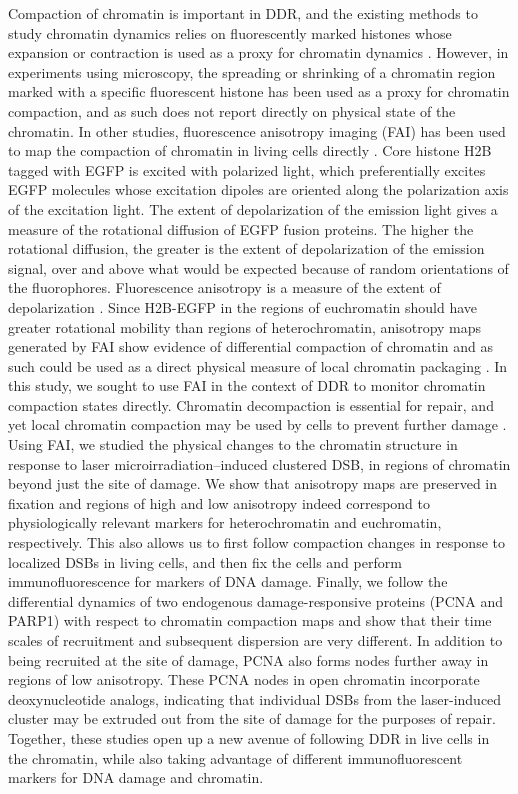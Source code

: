 Compaction of chromatin is important in DDR, and the existing methods to study chromatin dynamics relies on fluorescently marked histones whose expansion or contraction is used as a proxy for chromatin dynamics \cite{BURGESS20141703}.  However, in experiments using microscopy, the spreading or shrinking of a chromatin region marked with a specific fluorescent histone has been used as a proxy for chromatin compaction, and as such does not report directly on physical state of the chromatin. In other studies, fluorescence anisotropy imaging (FAI) has been used to map the compaction of chromatin in living cells directly \cite{banerjee2006chromatin}. Core histone H2B tagged with EGFP is excited with polarized light, which preferentially excites EGFP molecules whose excitation dipoles are oriented along the polarization axis of the excitation light. The extent of depolarization of the emission light gives a measure of the rotational diffusion of EGFP fusion proteins. The higher the rotational diffusion, the greater is the extent of depolarization of the emission signal, over and above what would be expected because of random orientations of the fluorophores. Fluorescence anisotropy is a measure of the extent of depolarization \cite{lakowicz2013principles,ghosh2012dynamic}. Since H2B-EGFP in the regions of euchromatin should have greater rotational mobility than regions of heterochromatin, anisotropy maps generated by FAI show evidence of differential compaction of chromatin and as such could be used as a direct physical measure of local chromatin packaging \cite{bhattacharya2009spatio}. In this study, we sought to use FAI in the context of DDR to monitor chromatin compaction states directly. Chromatin decompaction is essential for repair, and yet local chromatin compaction may be used by cells to prevent further damage \cite{BURGESS20141703}. Using FAI, we studied the physical changes to the chromatin structure in response to laser microirradiation–induced clustered DSB, in regions of chromatin beyond just the site of damage. We show that anisotropy maps are preserved in fixation and regions of high and low anisotropy indeed correspond to physiologically relevant markers for heterochromatin and euchromatin, respectively. This also allows us to first follow compaction changes in response to localized DSBs in living cells, and then fix the cells and perform immunofluorescence for markers of DNA damage. Finally, we follow the differential dynamics of two endogenous damage-responsive proteins (PCNA and PARP1) with respect to chromatin compaction maps and show that their time scales of recruitment and subsequent dispersion are very different. In addition to being recruited at the site of damage, PCNA also forms nodes further away in regions of low anisotropy. These PCNA nodes in open chromatin incorporate deoxynucleotide analogs, indicating that individual DSBs from the laser-induced cluster may be extruded out from the site of damage for the purposes of repair. Together, these studies open up a new avenue of following DDR in live cells in the chromatin, while also taking advantage of different immunofluorescent markers for DNA damage and chromatin.

